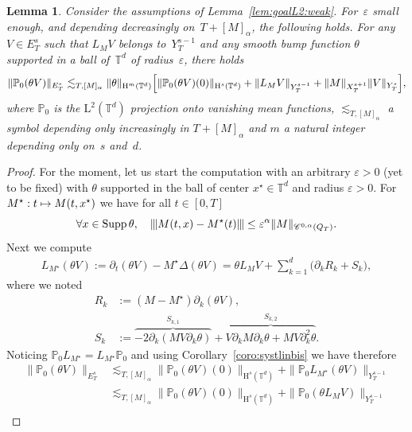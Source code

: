 \documentclass[10pt]{amsart}
\newcommand\mto{\mathchoice{\longmapsto}{\mapsto}{\mapsto}{\mapsto}}
\DeclareMathOperator{\Supp}{Supp}
\newtheorem{lem}[prop]{Lemma}
\theoremstyle{definition}
\newcommand\T{\mathbb{T}}
\renewcommand\H{\mathrm{H}}
\renewcommand\L{\mathrm{L}}
\let\ep\varepsilon
\newcommand{\vertiii}[1]{{\vert\kern-0.08em\vert\kern-0.08em\vert #1 \vert\kern-0.08em\vert\kern-0.08em\vert}}
\begin{document}
\begin{lem}\label{lem:loc}
Consider the assumptions of Lemma~\ref{lem:goalL2:weak}. For~$\ep$ small enough, and depending decreasingly on~$T+[M]_\alpha$, the following holds. For any $V\in E_T^s$ such that $L_{M }V $ belongs to~$Y_T^{s-1}$ and any smooth bump function $\theta$ supported in a ball of~$\T^d$ of radius~$\ep$, there holds
\[
\|\mathbb{P}_0(\theta V)\|_{E_T^s} \lesssim_{T,[M]_\alpha}\|\theta\|_{\H^{m}(\T^d)}\Bigl[\|\mathbb{P}_0(\theta V)(0)\|_{\H^s(\T^d)} + \| L_{M }V\|_{Y_T^{s-1}} + \|M\|_{X_T^{s+1}} \| V \|_{Y_T^s}\Bigr],
\]
where $\mathbb{P}_0$ is the $\L^2(\T^d)$ projection onto vanishing mean functions, $\lesssim_{T,[M]_\alpha}$ a symbol depending only increasingly in $T+[M]_\alpha$ and $m$ a natural integer depending only on~$s$ and~$d$.
\end{lem}
\begin{proof}
For the moment, let us start the computation with an arbitrary $\ep>0$ (yet to be fixed) with $\theta$ supported in the ball of center $x^\star \in \T^d$ and radius $\ep>0$. For $M^\star: t\mto M(t,x^\star)$ we have for all $t\in[0,T]$
\begin{equation}\label{PstarP}
\forall x \in \Supp \theta, \quad \vertiii{M(t,x)-M^\star(t)} \leq \ep^\alpha \|M\|_{\mathscr{C}^{0,\alpha}(Q_T)}.
\end{equation}
Next we compute
\begin{align} \label{eq:defF}
L_{M^\star}(\theta V):= \partial_t(\theta V)- M^\star \Delta (\theta V)= \theta L_{M}V + \sum_{k=1}^d \bigl(\partial_kR_k + S_k \bigr),
\end{align}
where we noted
\begin{align}
\label{eq:Rk} R_k &:= (M-M^\star)\partial_k(\theta V),\\
\label{eq:Sk} S_k &:= \stackrel{S_{k,1}}{\overbrace{-2 \partial_k (M V \partial_k \theta) }} + \stackrel{S_{k,2}}{\overbrace{ V \partial_k M \partial_k \theta+MV \partial^2_k \theta }}.
\end{align}
Noticing $\mathbb{P}_0L_{M^\star} = L_{M^\star}\mathbb{P}_0$ and using Corollary~\ref{coro:systlinbis} we have therefore
\begin{align*}
\|\mathbb{P}_0(\theta V)\|_{E_T^s} &\lesssim_{T,[M]_\alpha} \|\mathbb{P}_0(\theta V)(0)\|_{\H^s(\T^d)} + \|\mathbb{P}_0 L_{M^\star}(\theta V)\|_{Y_T^{s-1}}\\
&\lesssim_{T,[M]_\alpha} \|\mathbb{P}_0(\theta V)(0)\|_{\H^s(\T^d)} + \|\mathbb{P}_0(\theta L_M V)\|_{Y_T^{s-1}}\\[
-5pt]

\end{align*}
\end{proof}
\end{document}
